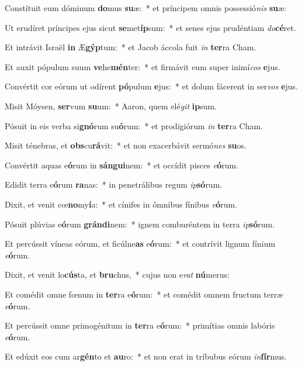 \item Constítuit eum dóminum \textbf{do}mus \textbf{su}æ:~* et príncipem omnis possessió\textit{nis} \textbf{su}æ:
\item Ut erudíret príncipes ejus sicut \textbf{se}met\textbf{íp}sum:~* et senes ejus prudéntiam \textit{do}\textbf{cé}ret.
\item Et intrávit Israël \textbf{in} Æ\textbf{gýp}tum:~* et Jacob áccola fuit \textit{in} \textbf{ter}ra Cham.
\item Et auxit pópulum suum \textbf{ve}he\textbf{mén}ter:~* et firmávit eum super inimí\textit{cos} \textbf{e}jus.
\item Convértit cor eórum ut odírent \textbf{pó}pulum \textbf{e}jus:~* et dolum fácerent in ser\textit{vos} \textbf{e}jus.
\item Misit Móysen, \textbf{ser}vum \textbf{su}um:~* Aaron, quem elé\textit{git} \textbf{ip}sum.
\item Pósuit in eis verba si\textbf{gnó}rum su\textbf{ó}rum:~* et prodigiórum \textit{in} \textbf{ter}ra Cham.
\item Misit ténebras, et \textbf{obs}cu\textbf{rá}vit:~* et non exacerbávit sermó\textit{nes} \textbf{su}os.
\item Convértit aquas e\textbf{ó}rum in \textbf{sán}\textbf{gui}nem:~* et occídit pisces \textit{e}\textbf{ó}rum.
\item Edidit terra e\textbf{ó}rum \textbf{ra}nas:~* in penetrálibus regum \textit{ip}\textbf{só}rum.
\item Dixit, et venit cœ\textbf{no}my\textbf{í}a:~* et cínifes in ómnibus fínibus \textit{e}\textbf{ó}rum.
\item Pósuit plúvias e\textbf{ó}rum \textbf{grán}\textbf{di}nem:~* ignem comburéntem in terra \textit{ip}\textbf{só}rum.
\item Et percússit víneas eórum, et ficúlne\textbf{as} e\textbf{ó}rum:~* et contrívit lignum fínium \textit{e}\textbf{ó}rum.
\item Dixit, et venit lo\textbf{cús}ta, et \textbf{bru}chus,~* cujus non e\textit{rat} \textbf{nú}merus:
\item Et comédit omne fœnum in \textbf{ter}ra e\textbf{ó}rum:~* et comédit omnem fructum terræ \textit{e}\textbf{ó}rum.
\item Et percússit omne primogénitum in \textbf{ter}ra e\textbf{ó}rum:~* primítias omnis labóris \textit{e}\textbf{ó}rum.
\item Et edúxit eos cum ar\textbf{gén}to et \textbf{au}ro:~* et non erat in tríbubus eórum \textit{in}\textbf{fír}mus.
